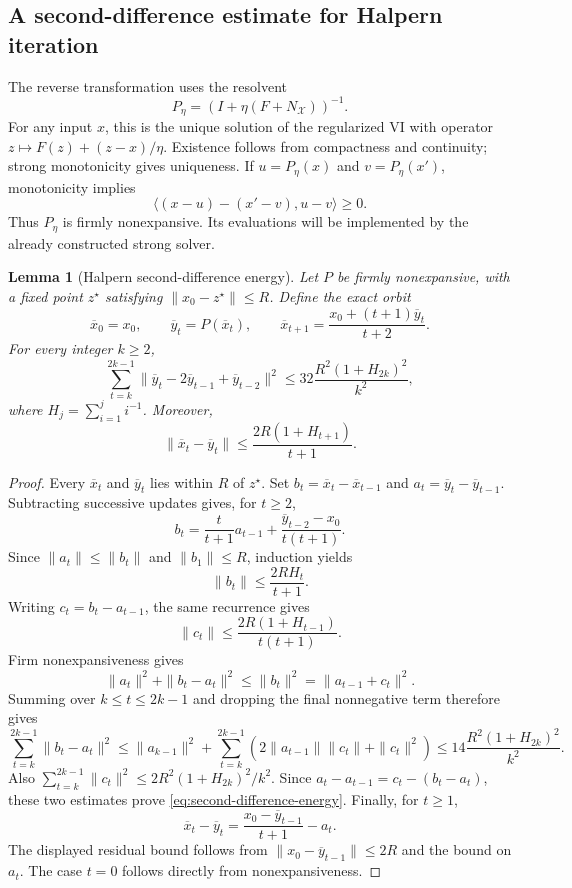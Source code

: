 \documentclass[11pt]{article}
\numberwithin{equation}{section}
\newtheorem{lemma}[theorem]{Lemma}
\theoremstyle{definition}
\theoremstyle{remark}
\begin{document}
\subsection{A second-difference estimate for Halpern iteration}

The reverse transformation uses the resolvent
\[
P_\eta=(I+\eta(F+N_{\mathcal X}))^{-1}.
\]
For any input \(x\), this is the unique solution of the regularized VI
with operator \(z\mapsto F(z)+(z-x)/\eta\). Existence follows from
compactness and continuity; strong monotonicity gives uniqueness.
If \(u=P_\eta(x)\) and \(v=P_\eta(x')\), monotonicity implies
\[
\langle(x-u)-(x'-v),u-v\rangle\ge0.
\]
Thus \(P_\eta\) is firmly nonexpansive. Its evaluations will be
implemented by the already constructed strong solver.

\begin{lemma}[Halpern second-difference energy]\label{lem:halpern-energy}
Let \(P\) be firmly nonexpansive, with a fixed point \(z^\star\)
satisfying \(\|x_0-z^\star\|\le R\). Define the exact orbit
\[
\overline x_0=x_0,\qquad \overline y_t=P(\overline x_t),\qquad
\overline x_{t+1}=\frac{x_0+(t+1)\overline y_t}{t+2}.
\]
For every integer \(k\ge2\),
\begin{equation}\label{eq:second-difference-energy}
\sum_{t=k}^{2k-1}
\|\overline y_t-2\overline y_{t-1}+\overline y_{t-2}\|^2
\le32\frac{R^2(1+H_{2k})^2}{k^2},
\end{equation}
where \(H_j=\sum_{i=1}^j i^{-1}\). Moreover,
\[
\|\overline x_t-\overline y_t\|
\le\frac{2R(1+H_{t+1})}{t+1}.
\]
\end{lemma}

\begin{proof}
Every \(\overline x_t\) and \(\overline y_t\) lies within \(R\) of
\(z^\star\). Set
\(b_t=\overline x_t-\overline x_{t-1}\) and
\(a_t=\overline y_t-\overline y_{t-1}\).
Subtracting successive updates gives, for \(t\ge2\),
\[
b_t=\frac{t}{t+1}a_{t-1}
       +\frac{\overline y_{t-2}-x_0}{t(t+1)}.
\]
Since \(\|a_t\|\le\|b_t\|\) and \(\|b_1\|\le R\), induction yields
\[
\|b_t\|\le\frac{2RH_t}{t+1}.
\]
Writing \(c_t=b_t-a_{t-1}\), the same recurrence gives
\[
\|c_t\|\le\frac{2R(1+H_{t-1})}{t(t+1)}.
\]
Firm nonexpansiveness gives
\[
\|a_t\|^2+\|b_t-a_t\|^2
\le\|b_t\|^2=\|a_{t-1}+c_t\|^2.
\]
Summing over \(k\le t\le2k-1\) and dropping the final nonnegative
term therefore gives
\[
\sum_{t=k}^{2k-1}\|b_t-a_t\|^2
\le\|a_{k-1}\|^2+
\sum_{t=k}^{2k-1}
       (2\|a_{t-1}\|\|c_t\|+\|c_t\|^2)
\le14\frac{R^2(1+H_{2k})^2}{k^2}.
\]
Also \(\sum_{t=k}^{2k-1}\|c_t\|^2
\le2R^2(1+H_{2k})^2/k^2\).
Since
\(a_t-a_{t-1}=c_t-(b_t-a_t)\), these two estimates prove
\eqref{eq:second-difference-energy}. Finally, for \(t\ge1\),
\[
\overline x_t-\overline y_t
=\frac{x_0-\overline y_{t-1}}{t+1}-a_t.
\]
The displayed residual bound follows from
\(\|x_0-\overline y_{t-1}\|\le2R\) and the bound on \(a_t\).
The case \(t=0\) follows directly from nonexpansiveness.
\end{proof}
\end{document}
